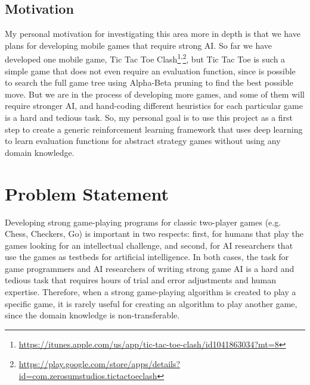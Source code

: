 \documentclass{article}
\begin{document}
\hspace{-2mm}

 
\subsection{Motivation}

\newcommand{\URLticapp}{https://itunes.apple.com/us/app/tic-tac-toe-clash/id1041863034?mt=8}
\newcommand{\URLticplay}{https://play.google.com/store/apps/details?id=com.zerosumstudios.tictactoeclash}

My personal motivation for investigating this area more in depth is that we have plans for
developing mobile games that require strong AI. So far we have developed one mobile game, {Tic Tac
Toe Clash}\footnote{\url{\URLticapp}}\textsuperscript{,}\footnote{\url{\URLticplay}}, but Tic Tac
Toe is such a simple game that does not even require an evaluation function, since is possible to
search the full game tree using Alpha-Beta pruning to find the best possible move. But we are in the
process of developing more games, and some of them will require stronger AI, and hand-coding
different heuristics for each particular game is a hard and tedious task. So, my personal goal is to
use this project as a first step to create a generic reinforcement learning framework that uses deep
learning to learn evaluation functions for abstract strategy games without using any domain
knowledge.

\section{Problem Statement}
\label{sec:problem-statement}


Developing strong game-playing programs for classic two-player games (e.g. Chess, Checkers, Go) is
important in two respects: first, for humans that play the games looking for an intellectual
challenge, and second, for AI researchers that use the games as testbeds for artificial
intelligence. In both cases, the task for game programmers and AI researchers of writing strong game
AI is a hard and tedious task that requires hours of trial and error adjustments and human
expertise. Therefore, when a strong game-playing algorithm is created to play a specific game, it is
rarely useful for creating an algorithm to play another game, since the domain knowledge is
non-transferable.
\end{document}
